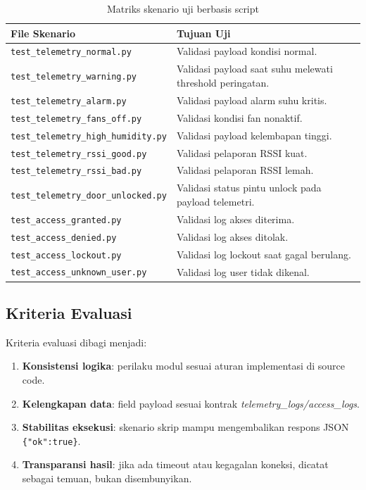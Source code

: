 \documentclass[10pt,a4paper,twocolumn]{article}
\begin{document}
\begin{table}[h]
\centering
\caption{Matriks skenario uji berbasis script}
\label{tab:scenario-matrix}
\scriptsize
\begin{tabularx}{0.98\columnwidth}{p{}Y}
\toprule
\textbf{File Skenario} & \textbf{Tujuan Uji} \\ \midrule
\texttt{test\_telemetry\_normal.py} & Validasi payload kondisi normal. \\
\texttt{test\_telemetry\_warning.py} & Validasi payload saat suhu melewati threshold peringatan. \\
\texttt{test\_telemetry\_alarm.py} & Validasi payload alarm suhu kritis. \\
\texttt{test\_telemetry\_fans\_off.py} & Validasi kondisi fan nonaktif. \\
\texttt{test\_telemetry\_high\_humidity.py} & Validasi payload kelembapan tinggi. \\
\texttt{test\_telemetry\_rssi\_good.py} & Validasi pelaporan RSSI kuat. \\
\texttt{test\_telemetry\_rssi\_bad.py} & Validasi pelaporan RSSI lemah. \\
\texttt{test\_telemetry\_door\_unlocked.py} & Validasi status pintu unlock pada payload telemetri. \\
\texttt{test\_access\_granted.py} & Validasi log akses diterima. \\
\texttt{test\_access\_denied.py} & Validasi log akses ditolak. \\
\texttt{test\_access\_lockout.py} & Validasi log lockout saat gagal berulang. \\
\texttt{test\_access\_unknown\_user.py} & Validasi log user tidak dikenal. \\
\bottomrule
\end{tabularx}
\end{table}

\subsection{Kriteria Evaluasi}
Kriteria evaluasi dibagi menjadi:
\begin{enumerate}[leftmargin=*,nosep]
\item \textbf{Konsistensi logika}: perilaku modul sesuai aturan implementasi di source code.
\item \textbf{Kelengkapan data}: field payload sesuai kontrak \textit{telemetry\_logs/access\_logs}.
\item \textbf{Stabilitas eksekusi}: skenario skrip mampu mengembalikan respons JSON \texttt{\{"ok":true\}}.
\item \textbf{Transparansi hasil}: jika ada timeout atau kegagalan koneksi, dicatat sebagai temuan, bukan disembunyikan.
\end{enumerate}
\end{document}
